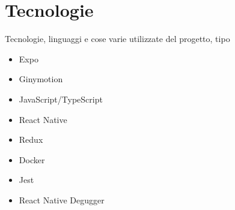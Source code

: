 
\chapter{Tecnologie}\label{chap:tec}
Tecnologie, linguaggi e cose varie utilizzate del progetto, tipo 
\begin{itemize}
	\item Expo
	\item Ginymotion
	\item JavaScript/TypeScript
	\item React Native
	\item Redux
	\item Docker
	\item Jest
	\item React Native Degugger
\end{itemize}